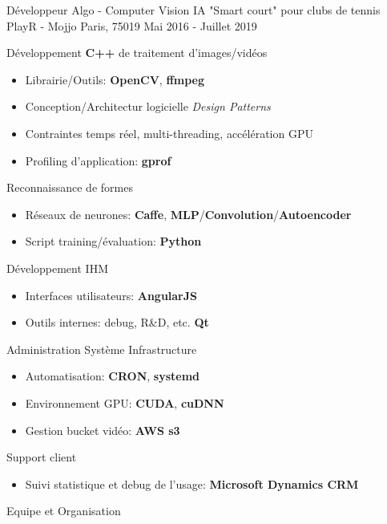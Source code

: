 \begin{cventries}
	\cventry
	{Développeur Algo - Computer Vision}
	{IA "Smart court" pour clubs de tennis}
	{PlayR - Mojjo} %
	{Paris, 75019} %
	{Mai 2016 - Juillet 2019} %
	{
		\begin{cvitems}
			\item {Développement \textbf{C++} de traitement d'images/vidéos}
			\begin{itemize}
				\item {Librairie\slash Outils: \textbf{OpenCV}, \textbf{ffmpeg}}
				\item {Conception\slash Architectur logicielle \textit{Design Patterns}}
				\item {Contraintes temps réel, multi-threading, accélération GPU}
				\item {Profiling d'application: \textbf{gprof}}
			\end{itemize}
			\item {Reconnaissance de formes}
			\begin{itemize}
				\item {Réseaux de neurones: \textbf{Caffe}, \textbf{MLP}\slash \textbf{Convolution}\slash \textbf{Autoencoder}}
				\item {Script training\slash évaluation: \textbf{Python}}
			\end{itemize}
			\item {Développement IHM}
			\begin{itemize}
				\item {Interfaces utilisateurs: \textbf{AngularJS}}
				\item {Outils internes: debug, R\&D, etc. \textbf{Qt}}
			\end{itemize}
			\item {Administration Système \- Infrastructure}
			\begin{itemize}
				\item {Automatisation: \textbf{CRON}, \textbf{systemd}}
				\item {Environnement GPU: \textbf{CUDA}, \textbf{cuDNN}}
				\item {Gestion bucket vidéo: \textbf{AWS s3}}
			\end{itemize}
			\item {Support client}
			\begin{itemize}
				\item {Suivi statistique et debug de l'usage: \textbf{Microsoft Dynamics CRM}}
			\end{itemize}
			\item {Equipe et Organisation}

\end{cvitems}}
\end{cventries}
